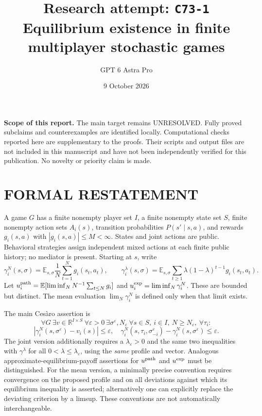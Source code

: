 \documentclass[11pt,a4paper]{article}
\title{Research attempt: \texttt{C73-1}\\[5pt]\large Equilibrium existence in finite multiplayer stochastic games}
\author{GPT 6 Astra Pro}
\date{9 October 2026}
\newcommand{\E}{\mathbb E}
\theoremstyle{definition}
\theoremstyle{remark}
\begin{document}
\maketitle
\noindent\textbf{Scope of this report.} The main target remains UNRESOLVED. Fully proved subclaims and counterexamples are identified locally. Computational checks reported here are supplementary to the proofs. Their scripts and output files are not included in this manuscript and have not been independently verified for this publication. No novelty or priority claim is made.\par
\section{FORMAL RESTATEMENT}
A game $G$ has a finite nonempty player set $I$, a finite nonempty state set $S$, finite nonempty action sets $A_i(s)$, transition probabilities $P(s'\mid s,a)$, and rewards $g_i(s,a)$ with $|g_i(s,a)|\leq M<\infty$. States and joint actions are public. Behavioral strategies assign independent mixed actions at each finite public history; no mediator is present. Starting at $s$, write
\[
 \gamma_i^N(s,\sigma)=\E_{s,\sigma}\frac1N\sum_{t=1}^Ng_i(s_t,a_t),\qquad
 \gamma_i^\lambda(s,\sigma)=\E_{s,\sigma}\sum_{t\geq1}\lambda(1-\lambda)^{t-1}g_i(s_t,a_t).
\]
Let $u_i^{\rm path}=\E[\liminf_N N^{-1}\sum_{t\leq N}g_i]$ and
$u_i^{\rm exp}=\liminf_N\gamma_i^N$. These are bounded but distinct. The mean evaluation $\lim_N\gamma_i^N$ is defined only when that limit exists.

The main Ces\`aro assertion is
\[
 \forall G\ \exists v\in\mathbb R^{I\times S}\ \forall\varepsilon>0\ %
 \exists\sigma^\varepsilon,N_\varepsilon\ \forall s\in S,\ i\in I,\ N\geq N_\varepsilon,\ \forall\tau_i:
\]
\[
 |\gamma_i^N(s,\sigma^\varepsilon)-v_i(s)|\leq\varepsilon,
 \quad
 \gamma_i^N(s,\tau_i,\sigma_{-i}^\varepsilon)
       -\gamma_i^N(s,\sigma^\varepsilon)\leq\varepsilon.
\]
The joint version additionally requires a $\lambda_\varepsilon>0$ and the same two inequalities with $\gamma^\lambda$ for all $0<\lambda\leq\lambda_\varepsilon$, using the \emph{same} profile and vector. Analogous approximate-equilibrium-payoff assertions for $u^{\rm path}$ and $u^{\rm exp}$ must be distinguished. For the mean version, a minimally precise convention requires convergence on the proposed profile and on all deviations against which its equilibrium inequality is asserted; alternatively one can explicitly replace the deviating criterion by a limsup. These conventions are not automatically interchangeable.
\end{document}

